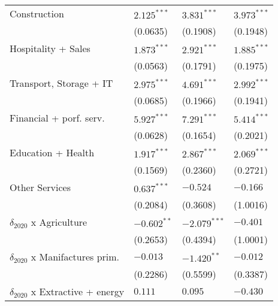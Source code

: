 \begin{tabular}{llll}
Construction                                       &      $2.125^{***}$ &      $3.831^{***}$ &      $3.973^{***}$ \\
                                                   &           (0.0635) &           (0.1908) &           (0.1948) \\
Hospitality + Sales                                &      $1.873^{***}$ &      $2.921^{***}$ &      $1.885^{***}$ \\
                                                   &           (0.0563) &           (0.1791) &           (0.1975) \\
Transport, Storage + IT                            &      $2.975^{***}$ &      $4.691^{***}$ &      $2.992^{***}$ \\
                                                   &           (0.0685) &           (0.1966) &           (0.1941) \\
Financial + porf. serv.                            &      $5.927^{***}$ &      $7.291^{***}$ &      $5.414^{***}$ \\
                                                   &           (0.0628) &           (0.1654) &           (0.2021) \\
Education + Health                                 &      $1.917^{***}$ &      $2.867^{***}$ &      $2.069^{***}$ \\
                                                   &           (0.1569) &           (0.2360) &           (0.2721) \\
Other Services                                     &      $0.637^{***}$ &           $-0.524$ &           $-0.166$ \\
                                                   &           (0.2084) &           (0.3608) &           (1.0016) \\
$\delta_{2020}$ x Agriculture                      &      $-0.602^{**}$ &     $-2.079^{***}$ &           $-0.401$ \\
                                                   &           (0.2653) &           (0.4394) &           (1.0001) \\
$\delta_{2020}$ x Manifactures prim.               &           $-0.013$ &      $-1.420^{**}$ &           $-0.012$ \\
                                                   &           (0.2286) &           (0.5599) &           (0.3387) \\
$\delta_{2020}$ x Extractive + energy              &            $0.111$ &            $0.095$ &           $-0.430$ \\

\end{tabular}
